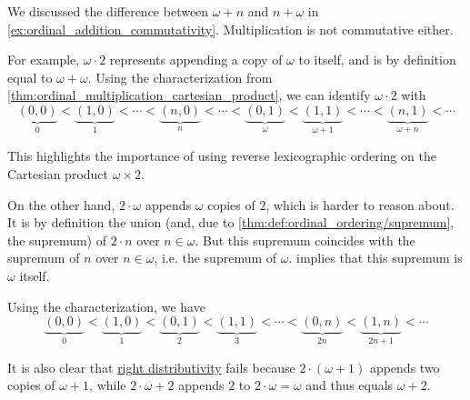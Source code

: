 \begin{example}\label{ex:ordinal_multiplication_commutativity}
  We discussed the difference between \( \omega + n \) and \( n + \omega \) in \cref{ex:ordinal_addition_commutativity}. Multiplication is not commutative either.

  For example, \( \omega \cdot 2 \) represents appending a copy of \( \omega \) to itself, and is by definition equal to \( \omega + \omega \). Using the characterization from \cref{thm:ordinal_multiplication_cartesian_product}, we can identify \( \omega \cdot 2 \) with
  \begin{equation*}
    \underbrace{(0, 0)}_0 < \underbrace{(1, 0)}_1 < \cdots < \underbrace{(n, 0)}_n < \cdots < \underbrace{(0, 1)}_\omega < \underbrace{(1, 1)}_{\omega + 1} < \cdots < \underbrace{(n, 1)}_{\omega + n} < \cdots
  \end{equation*}

  This highlights the importance of using reverse lexicographic ordering on the Cartesian product \( \omega \times 2 \).

  On the other hand, \( 2 \cdot \omega \) appends \( \omega \) copies of \( 2 \), which is harder to reason about. It is by definition the union (and, due to \cref{thm:def:ordinal_ordering/supremum}, the supremum) of \( 2 \cdot n \) over \( n \in \omega \). But this supremum coincides with the supremum of \( n \) over \( n \in \omega \), i.e. the supremum of \( \omega \).  implies that this supremum is \( \omega \) itself.

  Using the characterization, we have
  \begin{equation*}
    \underbrace{(0, 0)}_0 < \underbrace{(1, 0)}_1 < \underbrace{(0, 1)}_2 < \underbrace{(1, 1)}_3 < \cdots < \underbrace{(0, n)}_{2n} < \underbrace{(1, n)}_{2n + 1} < \cdots
  \end{equation*}

  It is also clear that \hyperref[def:semiring/theory/axioms/distributivity]{right distributivity} fails because \( 2 \cdot (\omega + 1) \) appends two copies of \( \omega + 1 \), while \( 2 \cdot \omega + 2 \) appends \( 2 \) to \( 2 \cdot \omega = \omega \) and thus equals \( \omega + 2 \).
\end{example}

